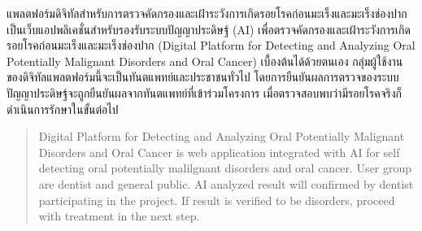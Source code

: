 \maketitle
\makesignature

\ifproject
\begin{abstractTH}

แพลตฟอร์มดิจิทัลสำหรับการตรวจคัดกรองและเฝ้าระวังการเกิดรอยโรคก่อนมะเร็งและมะเร็งช่องปาก 
เป็นเว็บแอปพลิเคชั่นสำหรับรองรับระบบปัญญาประดิษฐ์ (AI) 
เพื่อตรวจคัดกรองและเฝ้าระวังการเกิดรอยโรคก่อนมะเร็งและมะเร็งช่องปาก (Digital Platform for Detecting and Analyzing Oral Potentially Malignant Disorders and Oral Cancer) เบื้องต้นได้ด้วยตนเอง 
กลุ่มผู้ใช้งานของดิจิทัลแพลตฟอร์มนี้จะเป็นทันตแพทย์และประชาชนทั่วไป โดยการยืนยันผลการตรวจของระบบปัญญาประดิษฐ์จะถูกยืนยันผลจากทันตแพทย์ที่เข้าร่วมโครงการ 
เมื่อตรวจสอบพบว่ามีรอยโรคจริงก็ดำเนินการรักษาในขั้นต่อไป

\end{abstractTH}

\begin{abstract}

Digital Platform for Detecting and Analyzing Oral Potentially Malignant Disorders and Oral Cancer is web application integrated with AI
 for self detecting oral potentially malilgnant disorders and oral cancer. User group are dentist and general public.
  AI analyzed result will confirmed by dentist participating in the project. 
  If result is verified to be disorders, proceed with treatment in the next step.

\end{abstract}

\iffalse
\begin{dedication}
This document is dedicated to all Chiang Mai University students.

Dedication page is optional.
\end{dedication}
\fi %

